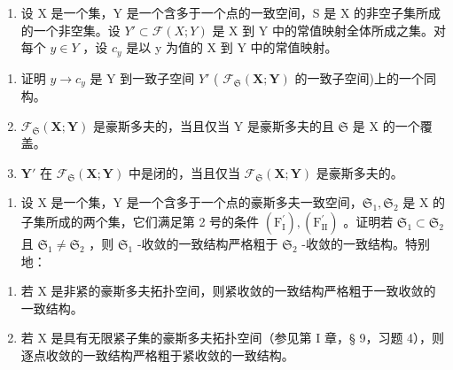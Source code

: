 \ExerciseSection

\begin{enumerate}
\def\labelenumi{\arabic{enumi})}
\tightlist
\item
  设 X 是一个集，Y 是一个含多于一个点的一致空间，S 是 X 的非空子集所成的一个非空集。设 \(Y' \subset \mathcal{F}(X; Y)\) 是 X 到 Y 中的常值映射全体所成之集。对每个 \(y \in Y\) ，设 \(c_{y}\) 是以 y 为值的 X 到 Y 中的常值映射。
\end{enumerate}

\begin{enumerate}
\def\labelenumi{\alph{enumi})}
\item
  证明 \(y \to c_{y}\) 是 Y 到一致子空间 \(Y'\) ( \(\mathcal{F}_{\mathfrak{S}}(\mathbf{X}; \mathbf{Y})\) 的一致子空间)上的一个同构。
\item
  \(\mathcal{F}_{\mathfrak{S}}(\mathbf{X};\mathbf{Y})\) 是豪斯多夫的，当且仅当 Y 是豪斯多夫的且 \(\mathfrak{S}\) 是 X 的一个覆盖。
\item
  \(\mathbf{Y}'\) 在 \(\mathcal{F}_{\mathfrak{S}}(\mathbf{X};\mathbf{Y})\) 中是闭的，当且仅当 \(\mathcal{F}_{\mathfrak{S}}(\mathbf{X};\mathbf{Y})\) 是豪斯多夫的。
\end{enumerate}

\begin{enumerate}
\def\labelenumi{\arabic{enumi})}
\setcounter{enumi}{1}
\tightlist
\item
  设 X 是一个集，Y 是一个含多于一个点的豪斯多夫一致空间，\(\mathfrak{S}_1, \mathfrak{S}_2\) 是 X 的子集所成的两个集，它们满足第 2 号的条件 \((\mathrm{F}_{\mathrm{I}}^{\prime}), (\mathrm{F}_{\mathrm{II}}^{\prime})\) 。证明若 \(\mathfrak{S}_1 \subset \mathfrak{S}_2\) 且 \(\mathfrak{S}_1 \neq \mathfrak{S}_2\) ，则 \(\mathfrak{S}_1\) -收敛的一致结构严格粗于 \(\mathfrak{S}_2\) -收敛的一致结构。特别地：
\end{enumerate}

\begin{enumerate}
\def\labelenumi{(\roman{enumi})}
\item
  若 X 是非紧的豪斯多夫拓扑空间，则紧收敛的一致结构严格粗于一致收敛的一致结构。
\item
  若 X 是具有无限紧子集的豪斯多夫拓扑空间（参见第 I 章，§ 9，习题 4），则逐点收敛的一致结构严格粗于紧收敛的一致结构。
\end{enumerate}

